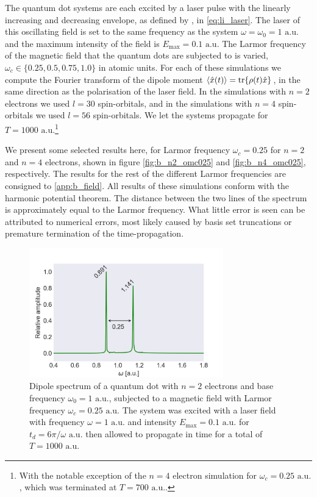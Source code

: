 The quantum dot systems are each excited by a laser pulse with the linearly increasing 
and decreasing envelope, as defined by \citeauthor{li2005time} \cite{li2005time}, in 
\autoref{eq:li_laser}. The laser of this oscillating field is set to the 
same frequency as the system $\omega=\omega_0=1 \text{ a.u.}$ and the maximum intensity of the field 
is $E_\text{max} = 0.1 \text{ a.u.}$ The Larmor frequency of the magnetic field that the 
quantum dots are subjected to is varied, $\omega_c\in\{0.25, 0.5, 0.75, 1.0\}$
in atomic units.
For each of these simulations we compute the Fourier transform of the dipole moment
$\ev{\hat{x}(t)} =\tr{\rho(t) \hat{x}}$, in 
the same direction as the polarisation of the laser field.
In the simulations with $n=2$ electrons we used $l=30$ spin-orbitals,
and in the simulations with $n=4$ spin-orbitals we used $l=56$ spin-orbitals.
We let the systems propagate for $T = 1000 \text{ a.u.}$\footnote{With the notable 
exception of the $n=4$ electron simulation for $\omega_c=0.25 \text{ a.u.}$, which was terminated 
at $T=700 \text{ a.u.}$.}

We present some selected results here, for Larmor frequency $\omega_c=0.25$ for 
$n=2$ and $n=4$ electrons, shown in figure \autoref{fig:b_n2_omc025}
and \autoref{fig:b_n4_omc025}, respectively.
The results for 
the rest of the different Larmor frequencies are consigned to \autoref{app:b_field}.
All results of these simulations conform with the harmonic potential theorem. The 
distance between the two lines of the spectrum is approximately equal to the 
Larmor frequency. What little error is seen can be attributed to numerical errors,
most likely caused by basis set truncations or premature termination of the
time-propagation.

\begin{figure}
    \centering
    \includegraphics[width=0.75\textwidth]
        {results/figures/B_field/n=2/b_spectrum_omc025.png}
    \caption{Dipole spectrum of a quantum dot with $n=2$ electrons and base frequency 
        $\omega_0 = 1 \text{ a.u.}$,
        subjected to a magnetic field with Larmor frequency 
        $\omega_c=0.25 \text{ a.u.}$ The 
        system was excited with a laser field with frequency $\omega = 1 \text{ a.u.}$ 
        and intensity $E_\text{max} = 0.1 \text{ a.u.}$ for $t_d = 6\pi/\omega \text{ a.u.}$ then 
        allowed to propagate in time for a total of $T=1000 \text{ a.u.}$} 
    \label{fig:b_n2_omc025}
\end{figure}

